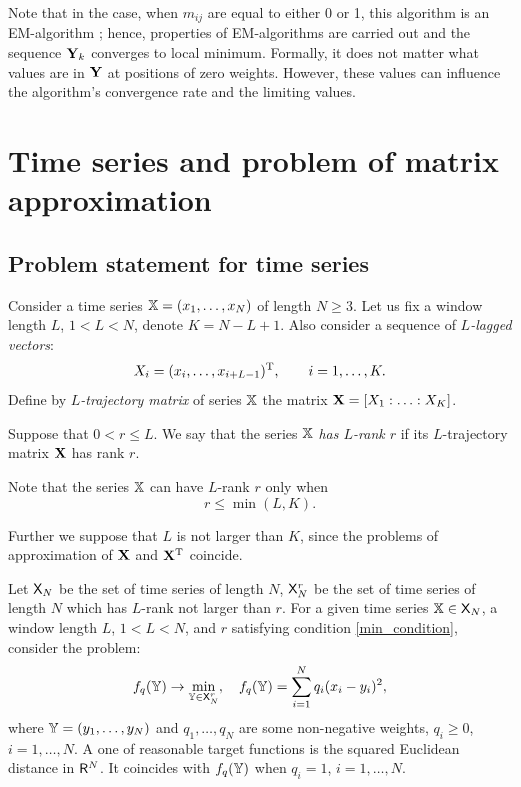 \documentclass[sii]{ipart}
\begin{document}
Note that in the case, when $m_{ij}$ are equal to either 0 or 1, this algorithm is an EM-algorithm \cite{Srebro2003};
hence, properties of EM-algorithms are carried out and the sequence $\mathbf{Y}_k$ converges to local minimum. Formally, it does not matter what values are in $\mathbf{Y}$ at positions of zero weights. However, these values can influence the algorithm's convergence rate and the limiting values.

\section{Time series and problem of matrix approximation}
\label{sec:ts_matrices}
\subsection{Problem statement for time series}
Consider a time series $\mathbb{X} = (x_1, \ldots, x_N)$ of length $N \ge 3$. Let us fix a window length $L$, $1 < L < N$, denote $K = N - L + 1$. Also consider a sequence of \emph{$L$-lagged vectors}:
\begin{equation}\label{l_lagged}
X_i = (x_i, \ldots, x_{i + L - 1})^\rmT, \qquad i = 1, \ldots, K.
\end{equation}
Define by \emph{$L$-trajectory matrix} of series $\mathbb{X}$ the matrix $\mathbf{X} = [X_1:\ldots:X_K]$.

Suppose that $0 < r \le L$. We say that the series $\mathbb{X}$ \emph{has $L$-rank $r$} if its $L$-trajectory matrix $\mathbf{X}$ has rank $r$.

Note that the series $\mathbb{X}$ can have $L$-rank $r$ only when
\begin{equation}
r \le \min(L, K). \label{min_condition}
\end{equation}

Further we suppose that $L$ is not larger than $K$, since the problems of approximation of $\mathbf{X}$ and $\mathbf{X}^{\mathrm{T}}$ coincide.

Let $\mathsf{X}_N$ be the set of time series of length $N$, $\mathsf{X}_N^r$ be the set of time series of length $N$ which has $L$-rank not larger than $r$. For a given time series $\mathbb{X} \in \mathsf{X}_N$, a window length $L$, $1 < L < N$, and $r$ satisfying condition \eqref{min_condition}, consider the problem:
\begin{equation} \label{L-rank_task}
f_q(\tsY) \to \min_{\tsY \in \sfX_N^r}, \quad f_q(\tsY) = \sum \limits_{i=1}^N q_i(x_i - y_i)^2,
\end{equation}
where $\mathbb{Y} = (y_1, \ldots, y_N)$ and $q_1, \ldots, q_N$ are some non-negative weights,
$q_i \ge 0$, $i = 1, \ldots, N$. A one of reasonable target functions is the squared Euclidean distance in $\mathsf{R}^N$. It coincides with $f_q(\mathbb{Y})$ when $q_i = 1$, $i = 1, \ldots, N$.
\end{document}
